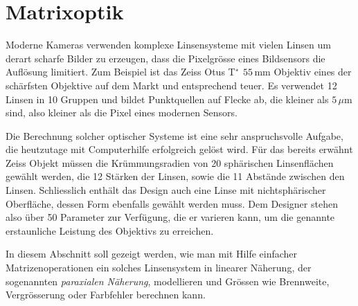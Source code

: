 %
%
%
\section{Matrixoptik
\label{section:matrixoptik}}
Moderne Kameras verwenden komplexe Linsensysteme mit vielen Linsen
um derart scharfe Bilder zu erzeugen, dass die Pixelgrösse eines
Bildsensors die Auflösung limitiert.
Zum Beispiel ist das Zeiss Otus T$\mathstrut^*$ $55\,\text{mm}$ Objektiv 
eines der schärfsten Objektive auf dem Markt und entsprechend teuer.
Es verwendet 12 Linsen in 10 Gruppen und bildet Punktquellen auf 
Flecke ab, die kleiner als $5\,\mu\text{m}$ sind, also kleiner als
die Pixel eines modernen Sensors.

Die Berechnung solcher optischer Systeme ist eine sehr anspruchsvolle
Aufgabe, die heutzutage mit Computerhilfe erfolgreich gelöst wird.
Für das bereits erwähnt Zeiss Objekt müssen die Krümmungsradien von 20
sphärischen Linsenflächen gewählt werden, die 12 Stärken der Linsen,
sowie die 11 Abstände zwischen den Linsen.
Schliesslich enthält das Design auch eine Linse mit nichtsphärischer
Oberfläche, dessen Form ebenfalls gewählt werden muss.
Dem Designer stehen also über 50 Parameter zur Verfügung, die er
varieren kann, um die genannte erstaunliche Leistung des Objektivs
zu erreichen.

In diesem Abschnitt soll gezeigt werden, wie man mit Hilfe einfacher
Matrizenoperationen ein solches Linsensystem in linearer Näherung,
der sogenannten {\em paraxialen Näherung}, modellieren und Grössen
wie Brennweite, Vergrösserung oder Farbfehler berechnen kann.










